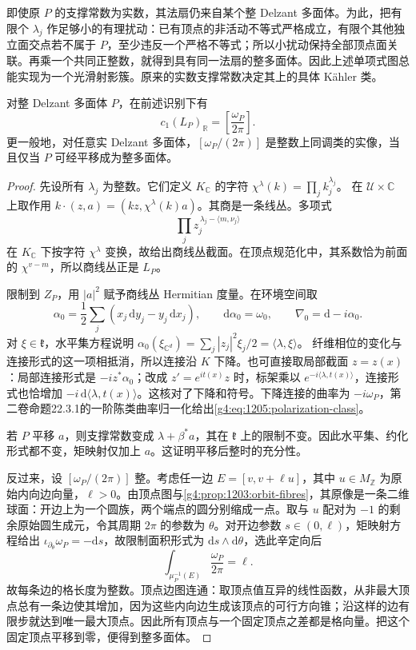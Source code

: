 即使原 \(P\) 的支撑常数为实数，其法扇仍来自某个整 Delzant 多面体。为此，把有限个 \(\lambda_j\) 作足够小的有理扰动：已有顶点的非活动不等式严格成立，有限个其他独立面交点若不属于 \(P\)，至少违反一个严格不等式；所以小扰动保持全部顶点面关联。再乘一个共同正整数，就得到具有同一法扇的整多面体。因此上述单项式图总能实现为一个光滑射影簇。原来的实数支撑常数决定其上的具体 Kähler 类。

\begin{proposition}\label{g4:prop:1205:polarization-class}
	对整 Delzant 多面体 \(P\)，在前述识别下有
	\begin{equation}\label{g4:eq:1205:polarization-class}
		c_1(L_P)_{\mathbb R}=\left[\frac{\omega_P}{2\pi}\right].
	\end{equation}
	更一般地，对任意实 Delzant 多面体，\([\omega_P/(2\pi)]\) 是整数上同调类的实像，当且仅当 \(P\) 可经平移成为整多面体。
\end{proposition}
\begin{proof}
	先设所有 \(\lambda_j\) 为整数。它们定义 \(K_{\mathbb C}\) 的字符
	\(\chi^\lambda(k)=\prod_jk_j^{\lambda_j}\)。
	在 \(\mathcal U\times\mathbb C\) 上取作用
	\(k\cdot(z,a)=(kz,\chi^\lambda(k)a)\)。其商是一条线丛。多项式
	\[
		\prod_j z_j^{\,\lambda_j-\langle m,\nu_j\rangle}
	\]
	在 \(K_{\mathbb C}\) 下按字符 \(\chi^\lambda\) 变换，故给出商线丛截面。在顶点规范化中，其系数恰为前面的 \(\chi^{v-m}\)，所以商线丛正是 \(L_P\)。

	限制到 \(Z_P\)，用 \(|a|^2\) 赋予商线丛 Hermitian 度量。在环境空间取
	\[
		\alpha_0=\frac12\sum_j(x_j\,\mathrm{d}y_j-y_j\,\mathrm{d}x_j),
		\qquad \mathrm{d}\alpha_0=\omega_0,
		\qquad \nabla_0=\mathrm{d}-i\alpha_0.
	\]
	对 \(\xi\in\mathfrak k\)，水平集方程说明
	\(\alpha_0(\xi_{\mathbb C^d})=\sum_j|z_j|^2\xi_j/2
	=\langle\lambda,\xi\rangle\)。
	纤维相位的变化与连接形式的这一项相抵消，所以连接沿 \(K\) 下降。也可直接取局部截面 \(z=z(x)\)：局部连接形式是 \(-i z^*\alpha_0\)；改成 \(z'=e^{it(x)}z\) 时，标架乘以 \(e^{-i\langle\lambda,t(x)\rangle}\)，连接形式也恰增加
	\(-i\,\mathrm{d}\langle\lambda,t(x)\rangle\)。这核对了下降和符号。下降连接的曲率为 \(-i\omega_P\)，第二卷命题22.3.1的一阶陈类曲率归一化给出\eqref{g4:eq:1205:polarization-class}。

	若 \(P\) 平移 \(a\)，则支撑常数变成
	\(\lambda+\beta^*a\)，其在 \(\mathfrak k\) 上的限制不变。因此水平集、约化形式都不变，矩映射仅加上 \(a\)。这证明平移后整时的充分性。

	反过来，设 \([\omega_P/(2\pi)]\) 整。考虑任一边
	\(E=[v,v+\ell u]\)，其中 \(u\in M_{\mathbb Z}\) 为原始内向边向量，\(\ell>0\)。由顶点图与\cref{g4:prop:1203:orbit-fibres}，其原像是一条二维球面：开边上为一个圆族，两个端点的圆分别缩成一点。取与 \(u\) 配对为 \(-1\) 的剩余原始圆生成元，令其周期 \(2\pi\) 的参数为 \(\theta\)。对开边参数 \(s\in(0,\ell)\)，矩映射方程给出 \(\iota_{\partial_\theta}\omega_P=-\mathrm{d}s\)，故限制面积形式为
	\(\mathrm{d}s\wedge\mathrm{d}\theta\)，选此辛定向后
	\[
		\int_{\mu_P^{-1}(E)}\frac{\omega_P}{2\pi}=\ell.
	\]
	故每条边的格长度为整数。顶点边图连通：取顶点值互异的线性函数，从非最大顶点总有一条边使其增加，因为这些内向边生成该顶点的可行方向锥；沿这样的边有限步就达到唯一最大顶点。因此所有顶点与一个固定顶点之差都是格向量。把这个固定顶点平移到零，便得到整多面体。
\end{proof}

